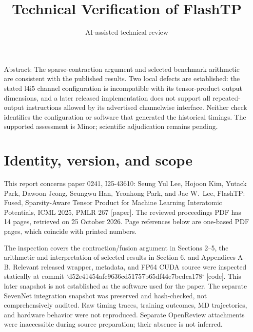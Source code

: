 \documentclass[10pt]{article}
\title{Technical Verification of FlashTP}
\author{AI-assisted technical review}
\date{}
\begin{document}
\maketitle
Abstract: The sparse-contraction argument and selected benchmark arithmetic are consistent with the published results. Two local defects are established: the stated l4i5 channel configuration is incompatible with its tensor-product output dimensions, and a later released implementation does not support all repeated-output instructions allowed by its advertised channelwise interface. Neither check identifies the configuration or software that generated the historical timings. The supported assessment is Minor; scientific adjudication remains pending.\par
\section*{Identity, version, and scope}
This report concerns paper 0241, I25-43610: Seung Yul Lee, Hojoon Kim, Yutack Park, Dawoon Jeong, Seungwu Han, Yeonhong Park, and Jae W. Lee, FlashTP: Fused, Sparsity-Aware Tensor Product for Machine Learning Interatomic Potentials, ICML 2025, PMLR 267 [paper]. The reviewed proceedings PDF has 14 pages, retrieved on 25 October 2026. Page references below are one-based PDF pages, which coincide with printed numbers.\par
The inspection covers the contraction/fusion argument in Sections 2–5, the arithmetic and interpretation of selected results in Section 6, and Appendices A–B. Relevant released wrapper, metadata, and FP64 CUDA source were inspected statically at commit `d52e41454afc9636cd51757b65df44e7bcdca178` [code]. This later snapshot is not established as the software used for the paper. The separate SevenNet integration snapshot was preserved and hash-checked, not comprehensively audited. Raw timing traces, training outcomes, MD trajectories, and hardware behavior were not reproduced. Separate OpenReview attachments were inaccessible during source preparation; their absence is not inferred.\par
\end{document}
